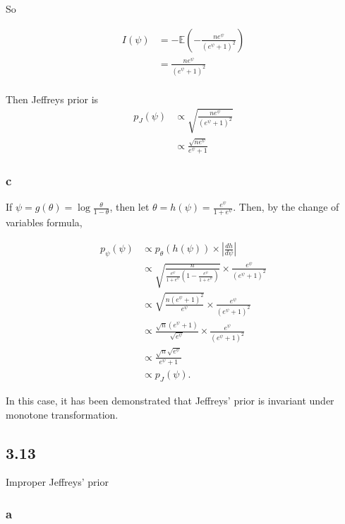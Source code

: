 \documentclass[
]{article}
\begin{document}
So

\begin{align}
I(\psi) &= -\mathbb{E}\left( - \frac{n e^\psi}{\left( e^\psi + 1 \right)^2}\right) \\
&= \frac{n e^\psi}{\left( e^\psi + 1 \right)^2} \\
\end{align}

Then Jeffreys prior is \begin{align}
p_J(\psi) &\propto \sqrt{ \frac{n e^\psi}{\left( e^\psi + 1 \right)^2} } \\
&\propto \frac{\sqrt{n e^\psi}}{e^\psi + 1}
\end{align}

\hypertarget{c-4}{%
\subsubsection{c}\label{c-4}}

If \(\psi = g(\theta) = \log \frac{\theta}{1 - \theta}\), then let
\(\theta = h(\psi) = \frac{e^\psi}{1 + e^\psi}\). Then, by the change of
variables formula,

\begin{align}
p_{\psi}(\psi) &\propto p_{\theta}(h(\psi)) \times \left| \frac{dh}{d\psi} \right| \\
&\propto \sqrt{\frac{n}{\frac{e^\psi}{1 + e^\psi} \left(1 - \frac{e^\psi}{1 + e^\psi}\right)}} \times \frac{e^\psi}{(e^\psi + 1)^2} \\
&\propto \sqrt{\frac{n(e^\psi + 1)^2}{e^\psi} } \times \frac{e^\psi}{(e^\psi + 1)^2} \\
&\propto \frac{\sqrt{n}(e^\psi + 1)}{\sqrt{e^\psi}} \times \frac{e^\psi}{(e^\psi + 1)^2} \\
&\propto \frac{\sqrt{n}\sqrt{e^\psi}}{e^\psi + 1} \\
&\propto p_J(\psi).
\end{align}

In this case, it has been demonstrated that Jeffreys' prior is invariant
under monotone transformation.

\hypertarget{section-8}{%
\subsection{3.13}\label{section-8}}

Improper Jeffreys' prior

\hypertarget{a-7}{%
\subsubsection{a}\label{a-7}}
\end{document}
